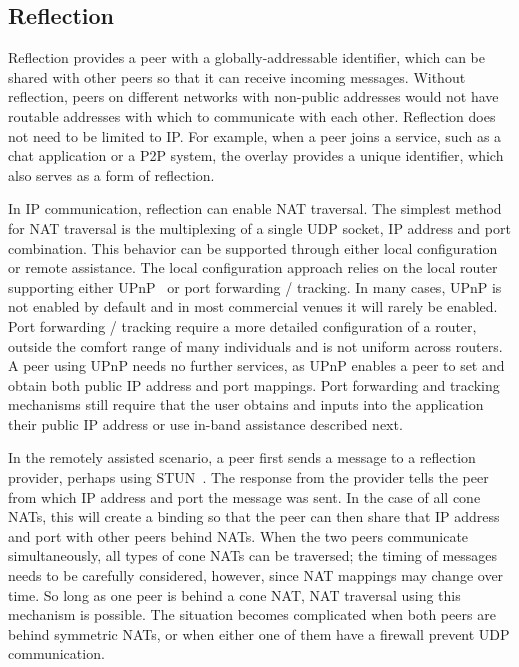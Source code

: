 \documentclass[conference]{IEEEtran}
\begin{document}
\subsection{Reflection}
\label{reflection}

Reflection provides a peer with a globally-addressable identifier, which can be
shared with other peers so that it can receive incoming messages.  Without
reflection, peers on different networks with non-public addresses would not
have routable addresses with which to communicate with each other.  Reflection
does not need to be limited to IP.  For example, when a peer joins a service,
such as a chat application or a P2P system, the overlay provides a unique
identifier, which also serves as a form of reflection.

In IP communication, reflection can enable NAT traversal.  The simplest method
for NAT traversal is the multiplexing of a single UDP socket, IP address and
port combination.  This behavior can be supported through either local
configuration or remote assistance.  The local configuration approach relies on
the local router supporting either UPnP~\cite{upnp} or port forwarding /
tracking.  In many cases, UPnP is not enabled by default and in most commercial
venues it will rarely be enabled.  Port forwarding / tracking require a more
detailed configuration of a router, outside the comfort range of many
individuals and is not uniform across routers.  A peer using UPnP needs no
further services, as UPnP enables a peer to set and obtain both public IP
address and port mappings.  Port forwarding and tracking mechanisms still
require that the user obtains and inputs into the application their public IP
address or use in-band assistance described next.

In the remotely assisted scenario, a peer first sends a message to a reflection
provider, perhaps using STUN~\cite{stun_rfc}.  The response from the provider
tells the peer from which IP address and port the message was sent.  In the
case of all cone NATs, this will create a binding so that the peer can then
share that IP address and port with other peers behind NATs.  When the two
peers communicate simultaneously, all types of cone NATs can be traversed; the
timing of messages needs to be carefully considered, however, since NAT
mappings may change over time.  So long as one peer is behind a cone NAT, NAT
traversal using this mechanism is possible.  The situation becomes complicated
when both peers are behind symmetric NATs, or when either one of them have a
firewall prevent UDP communication.  
\end{document}
